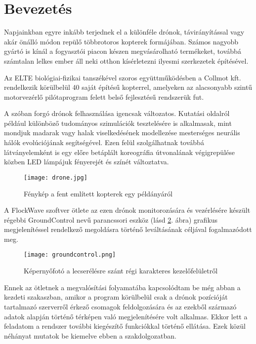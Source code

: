 \section{Bevezetés}

Napjainkban egyre inkább terjednek el a különféle drónok, távirányítással vagy
akár önálló módon repülő többrotoros kopterek formájában. Számos nagyobb gyártó is
kínál a fogyasztói piacon készen megvásárolható termékeket, továbbá számtalan
lelkes ember áll neki otthon kísérletezni ilyesmi szerkezetek építésével.

Az ELTE biológiai-fizikai tanszékével szoros együttműködésben a Collmot kft.
rendelkezik körülbelül 40 saját építésű kopterrel, amelyeken az alacsonyabb szintű
motorvezérlő pilótaprogram felett belső fejlesztésű rendszerük fut.

A szóban forgó drónok felhasználása igencsak változatos. Kutatási oldalról
például különböző tudományos szimulációk tesztelésére is alkalmasak, mint
mondjuk madarak vagy halak viselkedésének modellezése mesterséges neurális
hálók evolúciójának segítségével. Ezen felül szolgálhatnak továbbá
látványelemként is egy előre betáplált koreográfia útvonalának végigrepülése
közben LED lámpájuk fényerejét és színét változtatva.

\begin{figure}[h!]
  \center
  \texttt{[image: drone.jpg]}
  \caption{Fénykép a fent említett kopterek egy példányáról}
  \label{fig:drone}
\end{figure}

A FlockWave szoftver ötlete az ezen drónok monitorozására és vezérlésére készült
régebbi GroundControl nevű parancssori eszköz (lásd \ref{fig:groundcontrol}.
ábra) grafikus megjelenítéssel rendelkező megoldásra történő leváltásának
céljával fogalmazódott meg.


\begin{figure}[H]
  \texttt{[image: groundcontrol.png]}
  \caption{Képernyőfotó a lecserélésre szánt régi karakteres kezelőfelületről}
  \label{fig:groundcontrol}
\end{figure}

\noindent Ennek az ötletnek a megvalósítási folyamatába
kapcsolódtam be még abban a kezdeti szakaszban, amikor a program körülbelül csak
a drónok pozícióját tartalmazó szerverről érkező csomagok feldolgozására és az
ezekből származó adatok alapján történő térképen való megjelenítésére volt
alkalmas. Ekkor lett a feladatom a rendszer további kiegészítő funkciókkal
történő ellátása. Ezek közül néhányat mutatok be kiemelve ebben a
szakdolgozatban.
